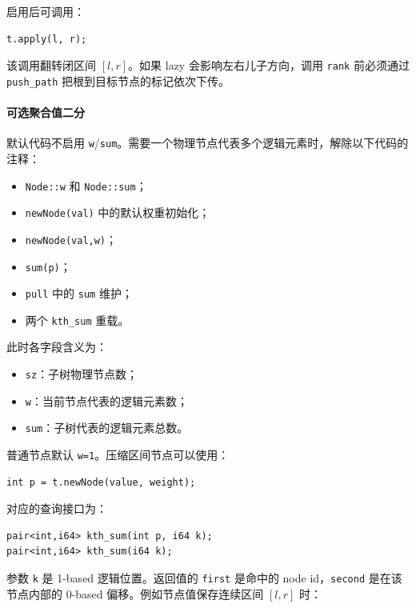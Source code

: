 启用后可调用：

\begin{verbatim}
t.apply(l, r);
\end{verbatim}

该调用翻转闭区间 $[l,r]$。如果 lazy 会影响左右儿子方向，调用 \texttt{rank} 前必须通过 \texttt{push\_path} 把根到目标节点的标记依次下传。

\paragraph*{可选聚合值二分}

默认代码不启用 \texttt{w}/\texttt{sum}。需要一个物理节点代表多个逻辑元素时，解除以下代码的注释：

\begin{itemize}
  \item \texttt{Node::w} 和 \texttt{Node::sum}；
  \item \texttt{newNode(val)} 中的默认权重初始化；
  \item \texttt{newNode(val,w)}；
  \item \texttt{sum(p)}；
  \item \texttt{pull} 中的 \texttt{sum} 维护；
  \item 两个 \texttt{kth\_sum} 重载。
\end{itemize}

此时各字段含义为：

\begin{itemize}
  \item \texttt{sz}：子树物理节点数；
  \item \texttt{w}：当前节点代表的逻辑元素数；
  \item \texttt{sum}：子树代表的逻辑元素总数。
\end{itemize}

普通节点默认 \texttt{w=1}。压缩区间节点可以使用：

\begin{verbatim}
int p = t.newNode(value, weight);
\end{verbatim}

对应的查询接口为：

\begin{verbatim}
pair<int,i64> kth_sum(int p, i64 k);
pair<int,i64> kth_sum(i64 k);
\end{verbatim}

参数 \texttt{k} 是 1-based 逻辑位置。返回值的 \texttt{first} 是命中的 node id，\texttt{second} 是在该节点内部的 0-based 偏移。例如节点值保存连续区间 $[l,r]$ 时：

